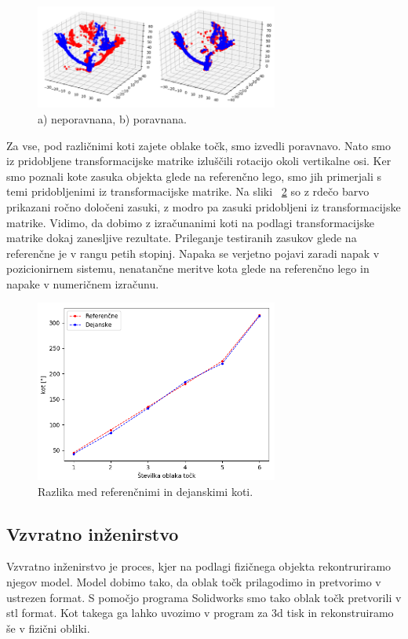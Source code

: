 \documentclass[journal,a4paper,twoside]{sty/IEEEtran}
\begin{document}
\begin{figure}[H]
	\centerline{\includegraphics[width=8cm]{fig/poravnava}}
	\caption{a) neporavnana, b) poravnana.}
	\label{fig:poravnava}
\end{figure}
%
Za vse, pod različnimi koti zajete oblake točk, smo izvedli poravnavo. Nato smo iz pridobljene transformacijske matrike izluščili rotacijo okoli vertikalne osi. Ker smo poznali kote zasuka objekta glede na referenčno lego, smo jih primerjali s temi pridobljenimi iz transformacijske matrike. Na sliki ~\ref{fig:poravnava_graf} so z rdečo barvo prikazani ročno določeni zasuki, z modro pa zasuki pridobljeni iz transformacijske matrike. Vidimo, da dobimo z izračunanimi koti na podlagi transformacijske matrike dokaj zanesljive rezultate. Prileganje testiranih zasukov glede na referenčne je v rangu petih stopinj. Napaka se verjetno pojavi zaradi napak v pozicionirnem sistemu, nenatančne meritve kota glede na referenčno lego in napake v numeričnem izračunu.

\begin{figure}[H]
	\centerline{\includegraphics[width=8cm]{fig/graf_poravnave}}
	\caption{Razlika med referenčnimi in dejanskimi koti.}
	\label{fig:poravnava_graf}
\end{figure}

\subsection{Vzvratno inženirstvo}
Vzvratno inženirstvo je proces, kjer na podlagi fizičnega objekta rekontruriramo njegov model. Model dobimo tako, da oblak točk prilagodimo in pretvorimo v ustrezen format. S pomočjo programa Solidworks smo 
tako oblak točk pretvorili v stl format. Kot takega ga lahko uvozimo v program za 3d tisk in  rekonstruiramo še v fizični obliki.
\end{document}
